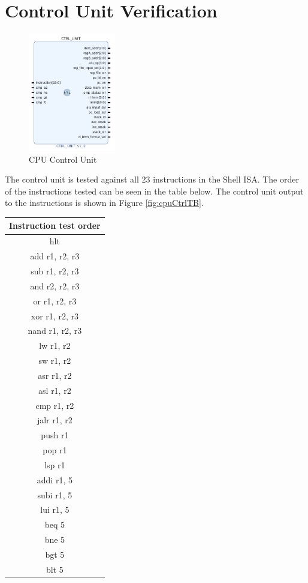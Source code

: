 \documentclass{article}
\begin{document}
\section{Control Unit Verification}
\label{CTRL_TEST}
\begin{par}

	\begin{figure}[H]
		\centering
		\includegraphics[width=1.5in]{img/ctrl_unit.png}
		\caption{CPU Control Unit}
	\end{figure}

	The control unit is tested against all 23 instructions in the Shell ISA. The order of the instructions tested can be seen in the table below. The control unit output to the instructions is shown in Figure \ref{fig:cpuCtrlTB}.
	
	\begin{center}
		\begin{tabular}{|c|}
			\hline
			\textbf{Instruction test order} \\
			\hline
			hlt \\
			\hline
			add     r1, r2, r3 \\
			\hline
			sub     r1, r2, r3 \\
			\hline
			and     r2, r2, r3 \\
			\hline
			or      r1, r2, r3 \\
			\hline
			xor     r1, r2, r3 \\
			\hline
			nand    r1, r2, r3 \\
			\hline
			lw      r1, r2 \\
			\hline
			sw      r1, r2 \\
			\hline
			asr     r1, r2 \\
			\hline
			asl     r1, r2 \\
			\hline
			cmp     r1, r2 \\
			\hline
			jalr    r1, r2 \\
			\hline
			push    r1 \\
			\hline
			pop r1 \\
			\hline
			lsp r1 \\
			\hline
			addi    r1, 5 \\
			\hline
			subi    r1, 5 \\
			\hline
			lui     r1, 5 \\
			\hline
			beq     5 \\
			\hline
			bne     5 \\
			\hline
			bgt     5 \\
			\hline
			blt     5 \\
			\hline
		\end{tabular}
	\end{center}
	


\end{par}
\end{document}
